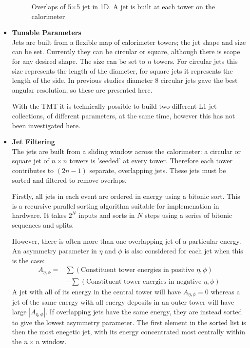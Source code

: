 \begin{itemize}
\begin{figure}[h]
\begin{center}
\caption{Overlaps of 5$\times$5 jet in 1D. A jet is built at each tower on the calorimeter}
\label{slide}
\end{center}
\end{figure}

\item  {\bf Tunable Parameters} \\
Jets are built from a flexible map of calorimeter towers;
the jet shape and size can be set. 
Currently they can be circular or square, although there is scope for any desired shape.
The size can be set to $n$ towers. 
For circular jets this size represents the length of the diameter, 
for square jets it represents the length of the side. 
In previous studies diameter 8 circular jets gave the best angular resolution, so these are presented here. 

With the TMT it is technically possible to build two different L1 jet collections, 
of different parameters, at the same time, however this has not been investigated here.


\item {\bf Jet Filtering} \\
The jets are built from a sliding window across the calorimeter: 
a circular or square jet of $n \times n$ towers is 'seeded' at every tower. 
Therefore each tower contributes to $\left(2n-1\right)$ separate, overlapping jets. 
These jets must be sorted and filtered to remove overlaps.

Firstly, all jets in each event are ordered in energy using a bitonic sort.
This is a recursive parallel sorting algorithm suitable for implemenation in hardware.
It takes $2^N$ inputs and sorts in $N$ steps using a series of bitonic sequences and splits.

However, there is often more than one overlapping jet of a particular energy. 
An asymmetry parameter in $\eta$ and $\phi$ is also considered for each jet when this is the case:
\begin{equation}
 \begin{split}
 A_{\eta, \phi} = & \sum \left( \text{Constituent tower energies in positive } \eta , \phi \right) \\ & - \sum \left( \text{Constituent tower energies in negative } \eta, \phi \right) 
 \end{split}
\label{eqn:Asym}
\end{equation}
A jet with all of its energy in the central tower will have $A_{\eta, \phi} = 0$ 
whereas a jet of the same energy with all energy deposits in an outer tower
 will have large $|A_{\eta, \phi}|$. 
If overlapping jets have the same energy, they are instead sorted 
to give the lowest asymmetry parameter.
The first element in the sorted list is then the most enegetic jet, with its energy concentrated most centrally within the $n\times n$ window.


\end{itemize}
